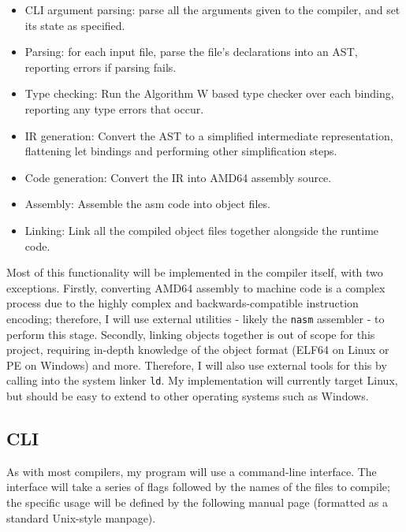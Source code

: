 \documentclass[9pt]{extarticle}
\begin{document}
\begin{itemize}
  \item CLI argument parsing: parse all the arguments given to the
    compiler, and set its state as specified.

  \item Parsing: for each input file, parse the file's declarations into
    an AST, reporting errors if parsing fails.

  \item Type checking: Run the Algorithm W based type checker over each
    binding, reporting any type errors that occur.

  \item IR generation: Convert the AST to a simplified intermediate
    representation, flattening let bindings and performing other
    simplification steps.

  \item Code generation: Convert the IR into AMD64 assembly source.

  \item Assembly: Assemble the asm code into object files.

  \item Linking: Link all the compiled object files together alongside
    the runtime code.
\end{itemize}

Most of this functionality will be implemented in the compiler itself,
with two exceptions. Firstly, converting AMD64 assembly to machine code
is a complex process due to the highly complex and backwards-compatible
instruction encoding; therefore, I will use external utilities - likely
the \verb'nasm' assembler - to perform this stage. Secondly, linking
objects together is out of scope for this project, requiring in-depth
knowledge of the object format (ELF64 on Linux or PE on Windows) and
more. Therefore, I will also use external tools for this by calling into
the system linker \verb'ld'. My implementation will currently target
Linux, but should be easy to extend to other operating systems such as
Windows.

\subsection{CLI}

As with most compilers, my program will use a command-line interface.
The interface will take a series of flags followed by the names of the
files to compile; the specific usage will be defined by the following
manual page (formatted as a standard Unix-style manpage).
\end{document}
